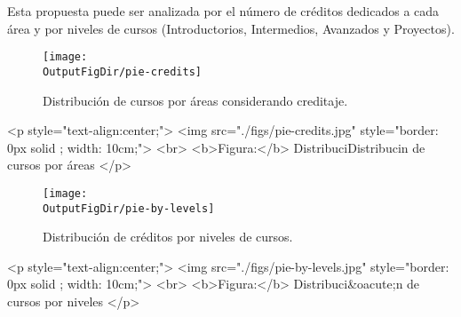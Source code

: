 Esta propuesta puede ser analizada por el número de créditos dedicados a cada área
y por niveles de cursos (Introductorios, Intermedios, Avanzados y Proyectos).
\vspace{0.5cm}
 
\begin{latexonly}
      \begin{figure}[H]
            \centering
            \texttt{[image: \\OutputFigDir/pie-credits]}
            \label{fig:pie-credits}
            \caption{Distribución de cursos por áreas considerando creditaje.}
      \end{figure}
\end{latexonly}

\begin{htmlonly}
      \begin{rawhtml}
            <p style="text-align:center;">
            <img src="./figs/pie-credits.jpg" style="border: 0px solid ; width: 10cm;"> <br>
            <b>Figura:</b> DistribuciDistribucin de cursos por áreas
            </p>
      \end{rawhtml}
\end{htmlonly}

% 


\begin{latexonly}
      \begin{figure}[H]
            \centering
            \texttt{[image: \\OutputFigDir/pie-by-levels]}
            \label{fig:pie-niveles}
            \caption{Distribución de créditos por niveles de cursos.}
      \end{figure}
\end{latexonly}
\begin{htmlonly}
      \begin{rawhtml}
            <p style="text-align:center;">
            <img src="./figs/pie-by-levels.jpg" style="border: 0px solid ; width: 10cm;"> <br>
            <b>Figura:</b> Distribuci&oacute;n de cursos por niveles
            </p>
      \end{rawhtml}
\end{htmlonly}